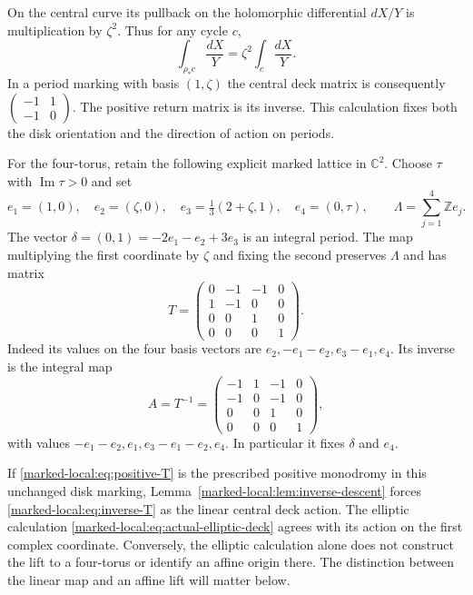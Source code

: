 On the central curve its pullback on the holomorphic differential
$dX/Y$ is multiplication by $\zeta^2$. Thus for any cycle $c$,
\[
 \int_{\rho_*c}\frac{dX}{Y}=\zeta^2\int_c\frac{dX}{Y}.
\]
In a period marking with basis $(1,\zeta)$ the central deck matrix
is consequently
$\left(\begin{smallmatrix}-1&1\\-1&0\end{smallmatrix}\right)$.
The positive return matrix is its inverse. This calculation fixes
both the disk orientation and the direction of action on periods.

For the four-torus, retain the following explicit marked lattice
in $\mathbb C^2$. Choose $\tau$ with $\operatorname{Im}\tau>0$ and set
\begin{equation}\label{marked-local:eq:period-lattice}
 e_1=(1,0),\quad e_2=(\zeta,0),\quad
 e_3=\tfrac13(2+\zeta,1),\quad e_4=(0,\tau),
 \qquad \Lambda=\sum_{j=1}^4\mathbb Ze_j.
\end{equation}
The vector $\delta=(0,1)=-2e_1-e_2+3e_3$ is an integral
period. The map multiplying the first coordinate by $\zeta$ and
fixing the second preserves $\Lambda$ and has matrix
\begin{equation}\label{marked-local:eq:positive-T}
 T=\begin{pmatrix}0&-1&-1&0\\1&-1&0&0\\0&0&1&0\\0&0&0&1\end{pmatrix}.
\end{equation}
Indeed its values on the four basis vectors are
$e_2,-e_1-e_2,e_3-e_1,e_4$. Its inverse is the integral map
\begin{equation}\label{marked-local:eq:inverse-T}
 A=T^{-1}=
 \begin{pmatrix}-1&1&-1&0\\-1&0&-1&0\\0&0&1&0\\0&0&0&1\end{pmatrix},
\end{equation}
with values $-e_1-e_2,e_1,e_3-e_1-e_2,e_4$.
In particular it fixes $\delta$ and $e_4$.

If \eqref{marked-local:eq:positive-T} is the prescribed positive monodromy in
this unchanged disk marking, Lemma~\ref{marked-local:lem:inverse-descent}
forces \eqref{marked-local:eq:inverse-T} as the linear central deck action.
The elliptic calculation \eqref{marked-local:eq:actual-elliptic-deck} agrees
with its action on the first complex coordinate. Conversely, the
elliptic calculation alone does not construct the lift to a
four-torus or identify an affine origin there. The distinction
between the linear map and an affine lift will matter below.

